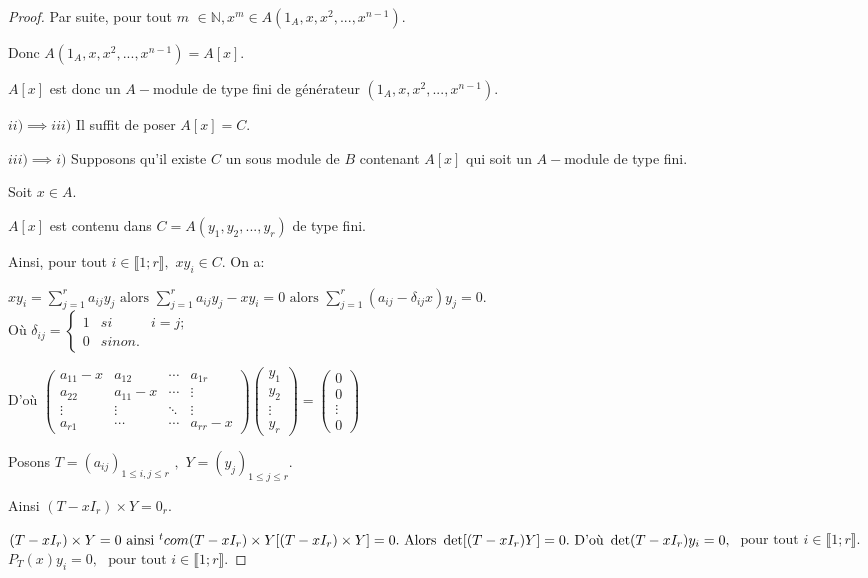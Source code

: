\begin{proof}
	Par suite, pour tout $m$ $\in \mathbb{N},x^{m}\in A(1_A,x,x^{2},...,x^{n-1}).$
	
	Donc $A(1_A,x,x^{2},...,x^{n-1})=A[x]$.
	
	$A[x]$ est donc un $A-$module de type fini de générateur $
	(1_A,x,x^{2},...,x^{n-1}).$
	
	$ii)\implies iii)$ Il suffit de poser $A[x]=C$.
	
	$iii)\implies i)$ Supposons qu'il existe $C$ un sous module de $B$ contenant $A[x]$ qui soit un $A-$module de type fini.
	
	Soit $x\in A.$
	
	$A[x]$ est contenu dans $ C=A(y_{1},y_{2},...,y_{r})$ de type fini.
	
	Ainsi, pour tout $i\in \llbracket 1; r \rrbracket ,$ $xy_{i}\in C.$ On
	a:
	
	$xy_{i}=\sum\limits_{j=1}^{r}a_{ij}y_{j}\text{ alors }
	\sum\limits_{j=1}^{r}a_{ij}y_{j}-xy_{i}=0\text{ alors }
	\sum\limits_{j=1}^{r}(a_{ij}-\delta _{ij}x)y_{j}=0$. \\Où $\delta_{ij}=\left\{ 
	\begin{array}{ccc}
		1 & { si } & i=j; \\ 
		0 & { sinon}.
	\end{array}
	\right. $
	
	D'où $\left( 
	\begin{array}{cccc}
		a_{11}-x & a_{12} & \cdots & a_{1r} \\ 
		a_{22} & a_{11}-x & \cdots& \vdots\\ 
		\vdots & \vdots& \ddots  & \vdots\\ 
		a_{r1} & \cdots & \cdots & a_{rr}-x
	\end{array}
	\right) \left( 
	\begin{array}{c}
		y_{1} \\ 
		y_{2} \\ 
		\vdots \\ 
		y_{r}
	\end{array}
	\right) =\left( 
	\begin{array}{c}
		0 \\ 
		0 \\ 
		\vdots\\ 
		0
	\end{array}
	\right) $
	
	Posons $T=(a_{ij})_{1\leq i,j\leq r}$ $,$ $Y=(y_{j})_{1\leq j\leq r}$. 
	
	Ainsi $(T-xI_{r})\times Y=0_{r}.$
	
	$(T-xI_{r})\times Y=0 \text{ ainsi } {^{t}com}(T-xI_{r})\times Y[(T-xI_{r})\times Y]=0. \\ 
	\text{ Alors } \det [(T-xI_{r})Y]=0. \\
	\text{ D'où } \det(T-xI_{r})y_{i}=0,$ $\text{ pour tout } i\in \llbracket 1; r \rrbracket $. 
	\\$P_{T}(x)y_{i}=0,$ $\text{ pour tout } i\in \llbracket 1; r \rrbracket.$
	

\end{proof}
